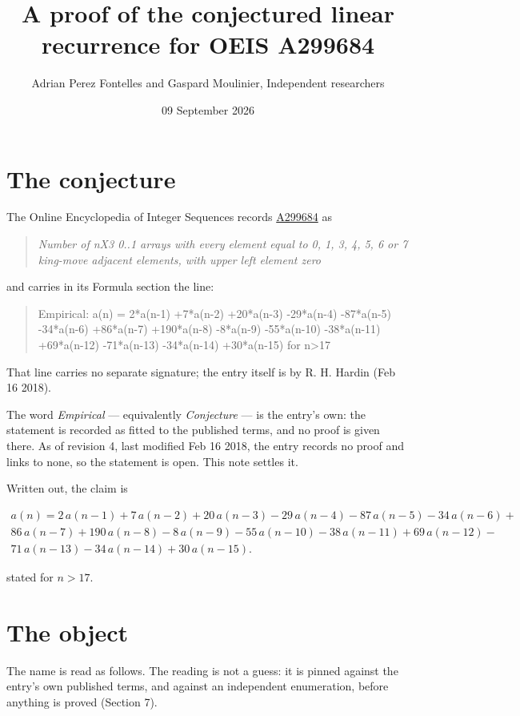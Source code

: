 \documentclass[11pt]{article}
\title{A proof of the conjectured linear recurrence for OEIS A299684}
\author{Adrian Perez Fontelles and Gaspard Moulinier, Independent researchers}
\date{09 September 2026}
\theoremstyle{definition}
\begin{document}
\maketitle
\section{The conjecture}

The Online Encyclopedia of Integer Sequences records \href{https://oeis.org/A299684}{A299684} as

\begin{quote}\itshape Number of nX3 0..1 arrays with every element equal to 0, 1, 3, 4, 5, 6 or 7 king-move adjacent elements, with upper left element zero\end{quote}

and carries in its Formula section the line:

\begin{quote}\ttfamily Empirical: a(n) = 2*a(n-1) +7*a(n-2) +20*a(n-3) -29*a(n-4) -87*a(n-5) -34*a(n-6) +86*a(n-7) +190*a(n-8) -8*a(n-9) -55*a(n-10) -38*a(n-11) +69*a(n-12) -71*a(n-13) -34*a(n-14) +30*a(n-15) for n>17\end{quote}

That line carries no separate signature; the entry itself is by R. H. Hardin (Feb 16 2018).

The word {\itshape Empirical} --- equivalently {\itshape Conjecture} --- is the entry's own: the statement is recorded as fitted to the published terms, and no proof is given there. As of revision 4, last modified Feb 16 2018, the entry records no proof and links to none, so the statement is open. This note settles it.

Written out, the claim is

\begin{multline*} a(n) = 2\,a(n-1) + 7\,a(n-2) + 20\,a(n-3) - 29\,a(n-4) - 87\,a(n-5) - 34\,a(n-6) + \\ 86\,a(n-7) + 190\,a(n-8) - 8\,a(n-9) - 55\,a(n-10) - 38\,a(n-11) + 69\,a(n-12) - \\ 71\,a(n-13) - 34\,a(n-14) + 30\,a(n-15). \end{multline*}

stated for $n > 17$.

\section{The object}

The name is read as follows. The reading is not a guess: it is pinned against the entry's own published terms, and against an independent enumeration, before anything is proved (Section 7).
\end{document}
